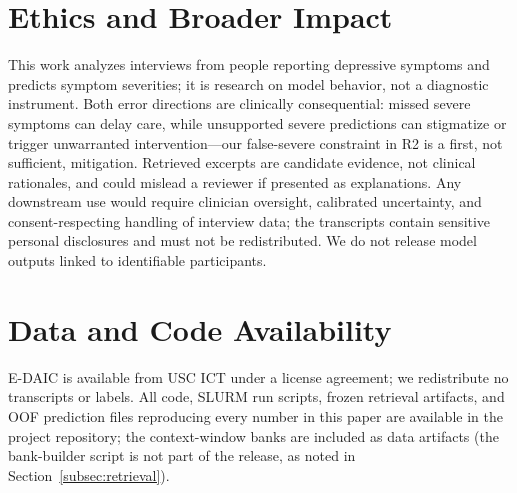 \documentclass{article}
\begin{document}
{\color{red}%
\section*{Ethics and Broader Impact}
This work analyzes interviews from people reporting depressive symptoms and predicts symptom severities; it is research on model behavior, not a diagnostic instrument. Both error directions are clinically consequential: missed severe symptoms can delay care, while unsupported severe predictions can stigmatize or trigger unwarranted intervention---our false-severe constraint in R2 is a first, not sufficient, mitigation. Retrieved excerpts are candidate evidence, not clinical rationales, and could mislead a reviewer if presented as explanations. Any downstream use would require clinician oversight, calibrated uncertainty, and consent-respecting handling of interview data; the transcripts contain sensitive personal disclosures and must not be redistributed. We do not release model outputs linked to identifiable participants.

\section*{Data and Code Availability}
E-DAIC is available from USC ICT under a license agreement; we redistribute no transcripts or labels. All code, SLURM run scripts, frozen retrieval artifacts, and OOF prediction files reproducing every number in this paper are available in the project repository; the context-window banks are included as data artifacts (the bank-builder script is not part of the release, as noted in Section~\ref{subsec:retrieval}).
}



\end{document}
